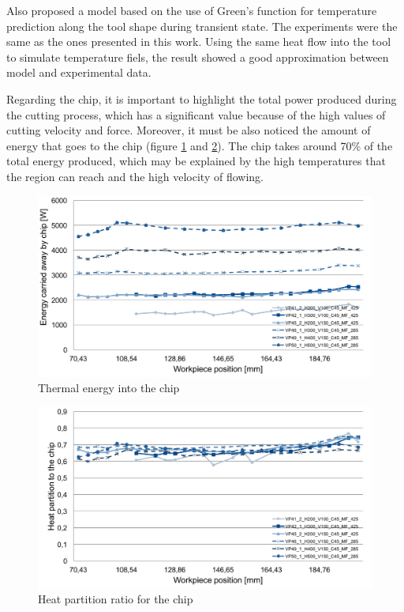 		Also  proposed a model based on the use of Green's function for temperature prediction along the tool shape during transient state. The experiments were the same as the ones presented in this work. Using the same heat flow into the tool to simulate temperature fiels, the result showed a good approximation between model and experimental data.

		Regarding the chip, it is important to highlight the total power produced during the cutting process, which has a significant value because of the high values of cutting velocity and force. Moreover, it must be also noticed the amount of energy that goes to the chip (figure \ref{fig:energyChip} and \ref{fig:hpartChip}). The chip takes around 70\% of the total energy produced, which may be explained by the high temperatures that the region can reach and the high velocity of flowing.

		\begin{figure}[H]
			\centering
			\captionsetup{justification=centering}
			\includegraphics[scale=0.55]{Imagens/energyChip.png}
			\caption{Thermal energy into the chip}
			\label{fig:energyChip}
		\end{figure}

		\begin{figure}[H]
			\centering
			\captionsetup{justification=centering}
			\includegraphics[scale=0.55]{Imagens/PartChip.png}
			\caption{Heat partition ratio for the chip}
			\label{fig:hpartChip}
		\end{figure}

